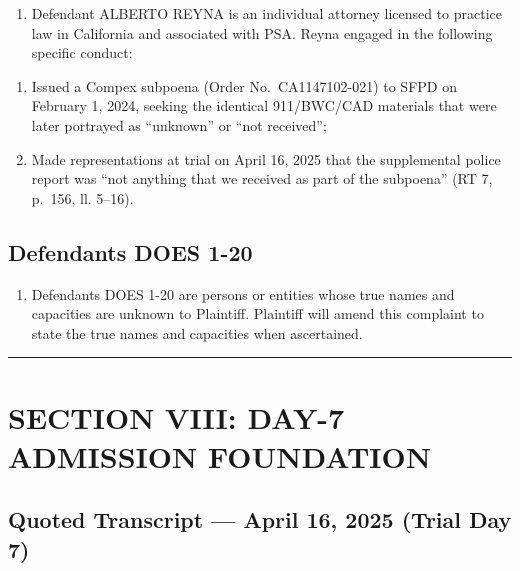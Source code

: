 \begin{enumerate}
\def\labelenumi{\arabic{enumi}.}
\setcounter{enumi}{45}
\tightlist
\item
  Defendant ALBERTO REYNA is an individual attorney licensed to practice law in California and associated with PSA. Reyna engaged in the following specific conduct:
\end{enumerate}

\begin{enumerate}
\def\labelenumi{(\alph{enumi})}
\item
  Issued a Compex subpoena (Order No.~CA1147102-021) to SFPD on February 1, 2024, seeking the identical 911/BWC/CAD materials that were later portrayed as ``unknown'' or ``not received'';
\item
  Made representations at trial on April 16, 2025 that the supplemental police report was ``not anything that we received as part of the subpoena'' (RT 7, p.~156, ll. 5--16).
\end{enumerate}

\subsection{Defendants DOES 1-20}\label{defendants-does-1-20}

\begin{enumerate}
\def\labelenumi{\arabic{enumi}.}
\setcounter{enumi}{46}
\tightlist
\item
  Defendants DOES 1-20 are persons or entities whose true names and capacities are unknown to Plaintiff. Plaintiff will amend this complaint to state the true names and capacities when ascertained.
\end{enumerate}

\begin{center}\rule{0.5\linewidth}{0.5pt}\end{center}

\label{toc:section-viii-day7-admission-foundation}
\section{SECTION VIII: DAY-7 ADMISSION FOUNDATION}\label{section-viii-day-7-admission-foundation}

\subsection{Quoted Transcript --- April 16, 2025 (Trial Day 7)}\label{quoted-transcript-april-16-2025-trial-day-7}

